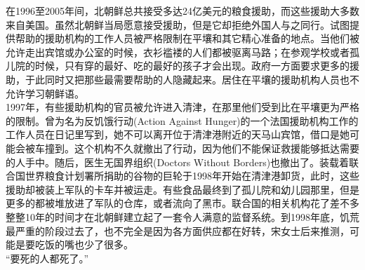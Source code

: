 在1996至2005年间，北朝鲜总共接受多达24亿美元的粮食援助，而这些援助大多数来自美国。虽然北朝鲜当局愿意接受援助，但是它却拒绝外国人与之同行。试图提供帮助的援助机构的工作人员被严格限制在平壤和其它精心准备的地点。当他们被允许走出宾馆或办公室的时候，衣衫褴褛的人们都被驱离马路；在参观学校或者孤儿院的时候，只有穿的最好、吃的最好的孩子才会出现。政府一方面要求更多的援助，于此同时又把那些最需要帮助的人隐藏起来。居住在平壤的援助机构人员也不允许学习朝鲜语。\\

1997年，有些援助机构的官员被允许进入清津，在那里他们受到比在平壤更为严格的限制。曾为名为反饥饿行动(Action Against Hunger)的一个法国援助机构工作的工作人员在日记里写到，她不可以离开位于清津港附近的天马山宾馆，借口是她可能会被车撞到。这个机构不久就撤出了行动，因为他们不能保证救援能够抵达需要的人手中。随后，医生无国界组织(Doctors Without Borders)也撤出了。装载着联合国世界粮食计划署所捐助的谷物的巨轮于1998年开始在清津港卸货，此时，这些援助却被装上军队的卡车并被运走。有些食品最终到了孤儿院和幼儿园那里，但是更多的都被堆放进了军队的仓库，或者流向了黑市。联合国的相关机构花了差不多整整10年的时间才在北朝鲜建立起了一套令人满意的监督系统。到1998年底，饥荒最严重的阶段过去了，也不完全是因为各方面供应都在好转，宋女士后来推测，可能是要吃饭的嘴也少了很多。\\

“要死的人都死了。”\\
